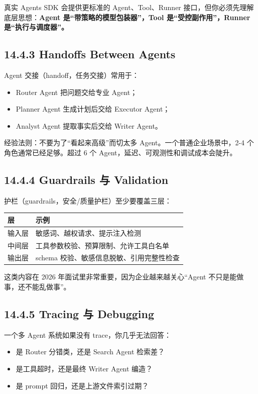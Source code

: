 真实 Agents SDK 会提供更标准的 Agent、Tool、Runner 接口，但你必须先理解底层思想：\textbf{Agent 是“带策略的模型包装器”，Tool 是“受控副作用”，Runner 是“执行与调度器”。}


\subsection{14.4.3 Handoffs Between Agents}

Agent 交接（handoff，任务交接）常用于：


\begin{itemize}[leftmargin=2em]
\item Router Agent 把问题交给专业 Agent；
\item Planner Agent 生成计划后交给 Executor Agent；
\item Analyst Agent 提取事实后交给 Writer Agent。
\end{itemize}

经验法则：不要为了``看起来高级''而切太多 Agent。一个普通企业场景中，2-4 个角色通常已经足够。超过 6 个 Agent，延迟、可观测性和调试成本会陡升。


\subsection{14.4.4 Guardrails 与 Validation}

护栏（guardrails，安全/质量护栏）至少要覆盖三层：


\begingroup
\scriptsize
\setlength{\tabcolsep}{3pt}
\begin{longtable}{|p{}|p{}|}
\hline
层 & 示例 \\ \hline
输入层 & 敏感词、越权请求、提示注入检测 \\ \hline
中间层 & 工具参数校验、预算限制、允许工具白名单 \\ \hline
输出层 & schema 校验、敏感信息脱敏、引用完整性检查 \\ \hline
\end{longtable}
\endgroup

这类内容在 2026 年面试里非常重要，因为企业越来越关心``Agent 不只是能做事，还不能乱做事''。


\subsection{14.4.5 Tracing 与 Debugging}

一个多 Agent 系统如果没有 trace，你几乎无法回答：


\begin{itemize}[leftmargin=2em]
\item 是 Router 分错类，还是 Search Agent 检索差？
\item 是工具超时，还是最终 Writer Agent 编造？
\item 是 prompt 回归，还是上游文件索引过期？
\end{itemize}

